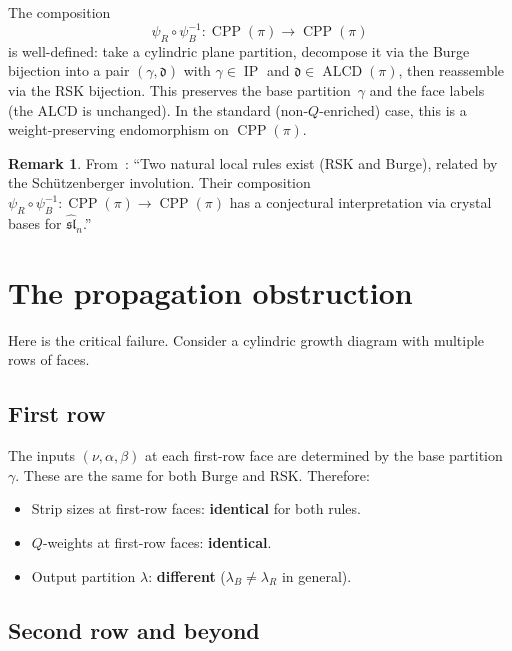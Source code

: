\documentclass[11pt]{article}
\newcommand{\CPP}{\operatorname{CPP}}
\newcommand{\ALCD}{\operatorname{ALCD}}
\newcommand{\IP}{\operatorname{IP}}
\theoremstyle{plain}
\theoremstyle{definition}
\newtheorem{remark}[theorem]{Remark}
\begin{document}
The composition
\begin{equation}\label{eq:psi-comp}
  \psi_R \circ \psi_B^{-1} \colon \CPP(\pi) \to \CPP(\pi)
\end{equation}
is well-defined: take a cylindric plane partition, decompose it
via the Burge bijection into a pair $(\gamma, \mathfrak{d})$
with $\gamma \in \IP$ and $\mathfrak{d} \in \ALCD(\pi)$, then
reassemble via the RSK bijection.  This preserves the base
partition~$\gamma$ and the face labels (the ALCD is unchanged).
In the standard (non-$Q$-enriched) case, this is a
weight-preserving endomorphism on $\CPP(\pi)$.

\begin{remark}
From~\cite{COMMUTATION}: ``Two natural local rules exist (RSK
and Burge), related by the Sch\"utzenberger involution.  Their
composition $\psi_R \circ \psi_B^{-1} \colon \CPP(\pi) \to
\CPP(\pi)$ has a conjectural interpretation via crystal bases
for $\widehat{\mathfrak{sl}}_n$.''
\end{remark}


\section{The propagation obstruction}
\label{sec:obstruction}

Here is the critical failure.  Consider a cylindric growth
diagram with multiple rows of faces.

\subsection{First row}

The inputs $(\nu, \alpha, \beta)$ at each first-row face are
determined by the base partition~$\gamma$.  These are the same
for both Burge and RSK.  Therefore:
\begin{itemize}
  \item Strip sizes at first-row faces: \textbf{identical} for
    both rules.
  \item $Q$-weights at first-row faces: \textbf{identical}.
  \item Output partition $\lambda$: \textbf{different}
    ($\lambda_B \neq \lambda_R$ in general).
\end{itemize}

\subsection{Second row and beyond}
\end{document}
